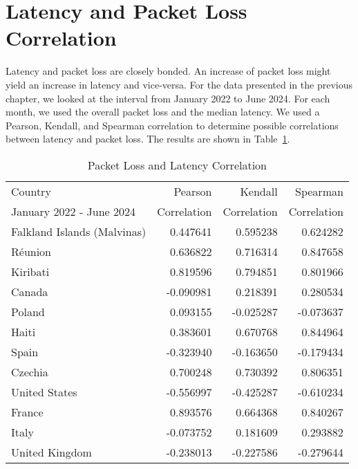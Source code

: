 \section{Latency and Packet Loss Correlation} \label{sec:latency-packetloss-correlation}

Latency and packet loss are closely bonded. An increase of packet loss might yield an increase in latency and vice-versa.
For the data presented in the previous chapter, we looked at the interval from January 2022 to June 2024.
For each month, we used the overall packet loss and the median latency.
We used a Pearson, Kendall, and Spearman correlation to determine possible correlations between latency and packet loss.
The results are shown in Table~\ref{fig:packetloss-latency-correlation}.

\begin{table}[ht]
	\caption{Packet Loss and Latency Correlation}
	\label{fig:packetloss-latency-correlation}
	\begin{tabular}{lrrr}
		\toprule
		Country                     & Pearson     & Kendall     & Spearman    \\
		January 2022 - June 2024    & Correlation & Correlation & Correlation \\
		\midrule
		Falkland Islands (Malvinas) & 0.447641    & 0.595238    & 0.624282    \\
		Réunion                     & 0.636822    & 0.716314    & 0.847658    \\
		Kiribati                    & 0.819596    & 0.794851    & 0.801966    \\
		Canada                      & -0.090981   & 0.218391    & 0.280534    \\
		Poland                      & 0.093155    & -0.025287   & -0.073637   \\
		Haiti                       & 0.383601    & 0.670768    & 0.844964    \\
		Spain                       & -0.323940   & -0.163650   & -0.179434   \\
		Czechia                     & 0.700248    & 0.730392    & 0.806351    \\
		United States               & -0.556997   & -0.425287   & -0.610234   \\
		France                      & 0.893576    & 0.664368    & 0.840267    \\
		Italy                       & -0.073752   & 0.181609    & 0.293882    \\
		United Kingdom              & -0.238013   & -0.227586   & -0.279644   \\

\end{tabular}
\end{table}
